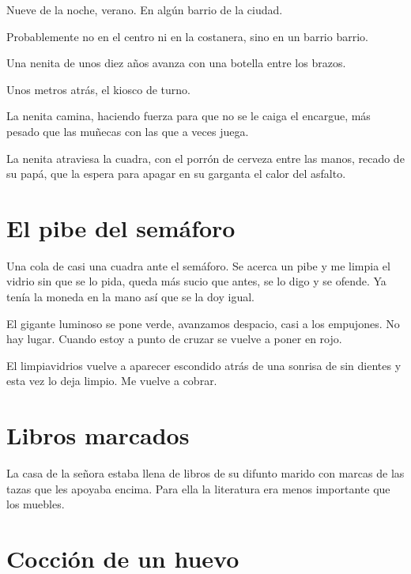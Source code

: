 \documentclass[11pt,twoside,openright,a6paper]{book}
\begin{document}
Nueve de la noche, verano. En algún barrio de la ciudad.

Probablemente no en el centro ni en la costanera, sino en un barrio barrio. 

Una nenita de unos diez años avanza con una botella entre los brazos. 

Unos metros atrás, el kiosco de turno. 

La nenita camina, haciendo fuerza para que no se le caiga el encargue, más pesado que las muñecas con las que a veces juega. 

La nenita atraviesa la cuadra, con el porrón de cerveza entre las manos, recado de su papá, que la espera para apagar en su garganta el calor del asfalto.

\chapter*{El pibe del semáforo}

Una cola de casi una cuadra ante el semáforo. Se acerca un pibe y me limpia el vidrio sin que se lo pida, queda más sucio que antes, se lo digo y se ofende. Ya tenía la moneda en la mano así que se la doy igual.

El gigante luminoso se pone verde, avanzamos despacio, casi a los empujones. No hay lugar. Cuando estoy a punto de cruzar se vuelve a poner en rojo.

El limpiavidrios vuelve a aparecer escondido atrás de una sonrisa de sin dientes y esta vez lo deja limpio.
Me vuelve a cobrar.

\chapter*{Libros marcados}

La casa de la señora estaba llena de libros de su difunto marido con marcas de las tazas que les apoyaba encima. Para ella la literatura era menos importante que los muebles.

\chapter*{Cocción de un huevo}
\end{document}
